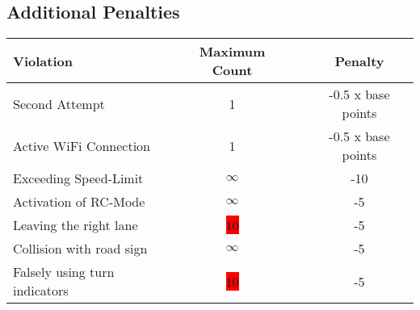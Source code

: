 {

\subsection*{Additional Penalties}
\begin{table}[H]
    \begin{tabular}{@{}lccc@{}}
        \toprule
        \textbf{Violation}            & \textbf{Maximum Count} &  & \textbf{Penalty}   \\
        \midrule
        Second Attempt                & 1                      &  & -0.5 x base points \\
        Active WiFi Connection        & 1                      &  & -0.5 x base points \\
        Exceeding Speed-Limit         & $\infty$               &  & -10                \\
        Activation of RC-Mode         & $\infty$               &  & -5                 \\
        Leaving the right lane        & \colorbox{red}{10}     &  & -5                 \\
        Collision with road sign      & $\infty$               &  & -5                 \\
        Falsely using turn indicators & \colorbox{red}{10}     &  & -5                 \\
        \bottomrule
    \end{tabular}
\end{table}
\clearpage
}
